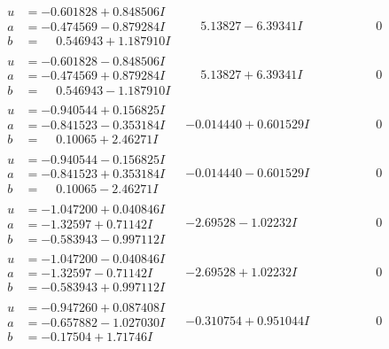 \documentclass[1p]{elsarticle_modified}
\theoremstyle{definition}
\begin{document}
$$\begin{array}{c|c|c}
\begin{aligned}
u &= -0.601828 + 0.848506 I \\
a &= -0.474569 - 0.879284 I \\
b &= \phantom{-}0.546943 + 1.187910 I\end{aligned}
 & \phantom{-}5.13827 - 6.39341 I & \phantom{-0.000000 } 0 \\ \hline\begin{aligned}
u &= -0.601828 - 0.848506 I \\
a &= -0.474569 + 0.879284 I \\
b &= \phantom{-}0.546943 - 1.187910 I\end{aligned}
 & \phantom{-}5.13827 + 6.39341 I & \phantom{-0.000000 } 0 \\ \hline\begin{aligned}
u &= -0.940544 + 0.156825 I \\
a &= -0.841523 - 0.353184 I \\
b &= \phantom{-}0.10065 + 2.46271 I\end{aligned}
 & -0.014440 + 0.601529 I & \phantom{-0.000000 } 0 \\ \hline\begin{aligned}
u &= -0.940544 - 0.156825 I \\
a &= -0.841523 + 0.353184 I \\
b &= \phantom{-}0.10065 - 2.46271 I\end{aligned}
 & -0.014440 - 0.601529 I & \phantom{-0.000000 } 0 \\ \hline\begin{aligned}
u &= -1.047200 + 0.040846 I \\
a &= -1.32597 + 0.71142 I \\
b &= -0.583943 - 0.997112 I\end{aligned}
 & -2.69528 - 1.02232 I & \phantom{-0.000000 } 0 \\ \hline\begin{aligned}
u &= -1.047200 - 0.040846 I \\
a &= -1.32597 - 0.71142 I \\
b &= -0.583943 + 0.997112 I\end{aligned}
 & -2.69528 + 1.02232 I & \phantom{-0.000000 } 0 \\ \hline\begin{aligned}
u &= -0.947260 + 0.087408 I \\
a &= -0.657882 - 1.027030 I \\
b &= -0.17504 + 1.71746 I\end{aligned}
 & -0.310754 + 0.951044 I & \phantom{-0.000000 } 0 \\ \hline\begin{aligned}

\end{aligned}
\end{array}$$
\end{document}
